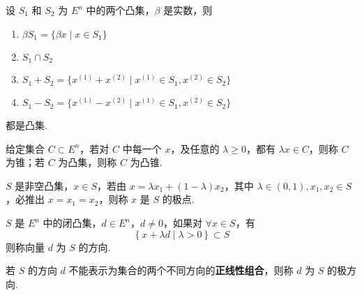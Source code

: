 \begin{theorem}
    设 $S_1$ 和 $S_2$ 为 $E^n$ 中的两个凸集，$\beta$ 是实数，则
    \begin{enumerate}
        \item $\beta S_1 = \{\beta x \mid x \in S_1\}$
        \item $S_1 \cap S_2$
        \item $S_1 + S_2 = \{x^{(1)} + x^{(2)} \mid x^{(1)} \in S_1, x^{(2)} \in S_2\}$
        \item $S_1 - S_2 = \{x^{(1)} - x^{(2)} \mid x^{(1)} \in S_1, x^{(2)} \in S_2\}$
    \end{enumerate}
    都是凸集.
\end{theorem}

\begin{definition}[凸锥]
    给定集合 $C \subset E^n$，若对 $C$ 中每一个 $x$，及任意的 $\lambda \ge 0$，都有 $\lambda x \in C$，则称 $C$ 为锥；若 $C$ 为凸集，则称 $C$ 为凸锥.
\end{definition}

\begin{definition}[极点]
    $S$ 是非空凸集，$x\in S$，若由 $x = \lambda x_1 + (1 - \lambda)x_2$，其中 $\lambda \in (0, 1), x_1, x_2 \in S$，必推出 $x = x_1 = x_2$，则称 $x$ 是 $S$ 的极点.
\end{definition}

\begin{definition}[极方向]
    $S$ 是 $E^n$ 中的闭凸集，$d \in E^n$，$d \neq 0$，如果对 $\forall x \in S$，有 
    \[\left\{x + \lambda d \mid \lambda > 0\right\} \subset S\]
    则称向量 $d$ 为 $S$ 的方向.
    
    若 $S$ 的方向 $d$ 不能表示为集合的两个不同方向的\textbf{正线性组合}，则称 $d$ 为 $S$ 的极方向.
\end{definition}

